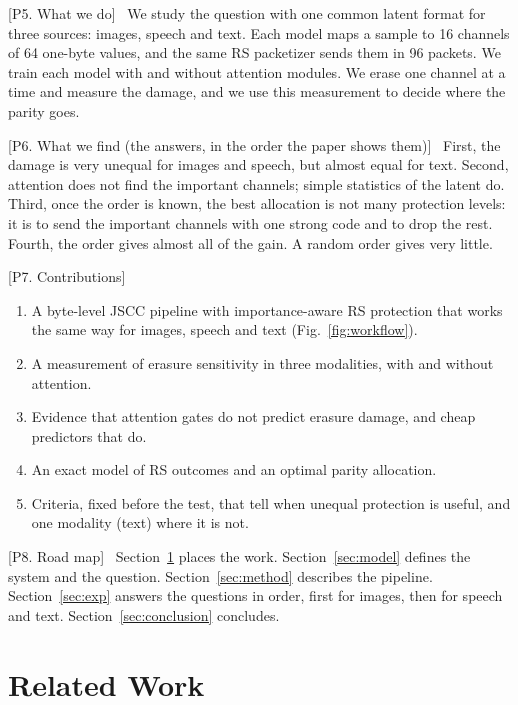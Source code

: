 \documentclass[journal]{IEEEtran}
\newcommand{\beat}[1]{\noindent\textcolor{blue!60!black}{\textsf{\footnotesize [#1]}}\ }
\begin{document}
\beat{P5. What we do}
We study the question with one common latent format for three sources: images, speech and text. Each
model maps a sample to 16 channels of 64 one-byte values, and the same RS packetizer sends them in 96
packets. We train each model with and without attention modules. We erase one channel at a time and
measure the damage, and we use this measurement to decide where the parity goes.

\beat{P6. What we find (the answers, in the order the paper shows them)}
First, the damage is very unequal for images and speech, but almost equal for text. Second, attention
does not find the important channels; simple statistics of the latent do. Third, once the order is
known, the best allocation is not many protection levels: it is to send the important channels with one
strong code and to drop the rest. Fourth, the order gives almost all of the gain. A random order gives
very little.

\beat{P7. Contributions}
\begin{enumerate}
\item A byte-level JSCC pipeline with importance-aware RS protection that works the same way for
images, speech and text (Fig.~\ref{fig:workflow}).
\item A measurement of erasure sensitivity in three modalities, with and without attention.
\item Evidence that attention gates do not predict erasure damage, and cheap predictors that do.
\item An exact model of RS outcomes and an optimal parity allocation.
\item Criteria, fixed before the test, that tell when unequal protection is useful, and one modality
(text) where it is not.
\end{enumerate}

\beat{P8. Road map}
Section~\ref{sec:related} places the work. Section~\ref{sec:model} defines the system and the question.
Section~\ref{sec:method} describes the pipeline. Section~\ref{sec:exp} answers the questions in order,
first for images, then for speech and text. Section~\ref{sec:conclusion} concludes.

\section{Related Work}\label{sec:related}
\end{document}
